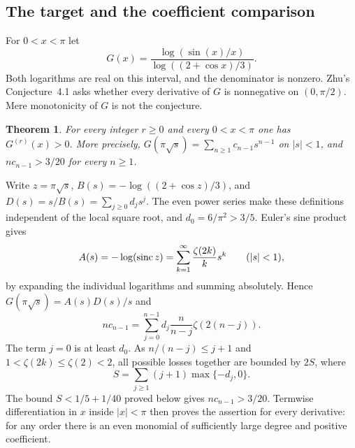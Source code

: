 \documentclass[11pt,a4paper]{article}
\newtheorem{SourceRceStheorem}{Theorem}
\begin{document}
\subsection{The target and the coefficient comparison}
For $0<x<\pi$ let
\[
 G(x)=\frac{\log(\sin(x)/x)}{\log((2+\cos x)/3)}.
\]
Both logarithms are real on this interval, and the denominator is nonzero. Zhu's Conjecture~4.1 \cite{R24S:zhu} asks whether every derivative of $G$ is nonnegative on $(0,\pi/2)$. Mere monotonicity of $G$ is not the conjecture.
\begin{SourceRceStheorem}
For every integer $r\ge0$ and every $0<x<\pi$ one has $G^{(r)}(x)>0$.
More precisely, $G(\pi\sqrt{s})=\sum_{n\ge1}c_{n-1}s^{n-1}$ on $|s|<1$, and $n c_{n-1}>3/20$ for every $n\ge1$.
\end{SourceRceStheorem}

Write $z=\pi\sqrt{s}$, $B(s)=-\log((2+\cos z)/3)$, and
$D(s)=s/B(s)=\sum_{j\ge0}d_j s^j$. The even power series make these definitions independent of the local square root, and $d_0=6/\pi^2>3/5$. Euler's sine product gives
\[
 A(s)=-\log(\operatorname{sinc} z)=\sum_{k=1}^\infty \frac{\zeta(2k)}{k}s^k
 \qquad(|s|<1),
\]
by expanding the individual logarithms and summing absolutely. Hence $G(\pi\sqrt{s})=A(s)D(s)/s$ and
\[
 n c_{n-1}=\sum_{j=0}^{n-1}d_j\frac{n}{n-j}\zeta(2(n-j)).
\]
The term $j=0$ is at least $d_0$. As $n/(n-j)\le j+1$ and $1<\zeta(2k)\le\zeta(2)<2$, all possible losses together are bounded by $2S$, where
\[
 S=\sum_{j\ge1}(j+1)\max\{-d_j,0\}.
\]
The bound $S<1/5+1/40$ proved below gives $n c_{n-1}>3/20$. Termwise differentiation in $x$ inside $|x|<\pi$ then proves the assertion for every derivative: for any order there is an even monomial of sufficiently large degree and positive coefficient.
\end{document}
